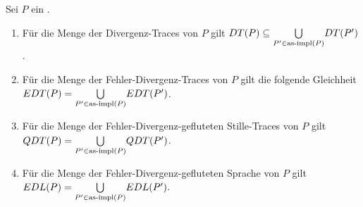 \vspace{0.2cm}

\begin{Prop}
  \label{DivSemProp}
  Sei $P$ ein \MEIO{}.
  \begin{enumerate}
    \item Für die Menge der Divergenz-Traces von $P$ gilt $DT (P) \subseteq
      \underset{P'\in\mathrm{as}\text{-}\mathrm{impl} (P)}{\bigcup} DT (P')$.
    \item Für die Menge der Fehler-Divergenz-Traces von $P$ gilt die folgende
      Gleichheit $EDT (P) = \underset{P'\in\mathrm{as}\text{-}\mathrm{impl} (P)}{\bigcup} EDT (P')$.
    \item Für die Menge der Fehler-Divergenz-gefluteten Stille-Traces von $P$
      gilt $QDT (P) = \underset{P'\in\mathrm{as}\text{-}\mathrm{impl} (P)}{\bigcup} QDT (P')$.
    \item Für die Menge der Fehler-Divergenz-gefluteten Sprache von $P$ gilt
      $EDL (P) = \underset{P'\in\mathrm{as}\text{-}\mathrm{impl} (P)}{\bigcup} EDL (P')$.
  \end{enumerate}
\end{Prop}
